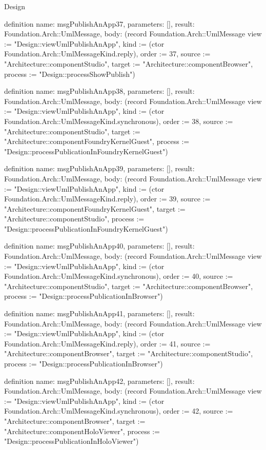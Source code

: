\begin{lexlean}{Design}
\begin{semanticmodule}
definition{
  name: msgPublishAnApp37,
  parameters: [],
  result: Foundation.Arch::UmlMessage,
  body: (record Foundation.Arch::UmlMessage {view := "Design::viewUmlPublishAnApp", kind := (ctor Foundation.Arch::UmlMessageKind.reply), order := 37, source := "Architecture::componentStudio", target := "Architecture::componentBrowser", process := "Design::processShowPublish"})
}

definition{
  name: msgPublishAnApp38,
  parameters: [],
  result: Foundation.Arch::UmlMessage,
  body: (record Foundation.Arch::UmlMessage {view := "Design::viewUmlPublishAnApp", kind := (ctor Foundation.Arch::UmlMessageKind.synchronous), order := 38, source := "Architecture::componentStudio", target := "Architecture::componentFoundryKernelGuest", process := "Design::processPublicationInFoundryKernelGuest"})
}

definition{
  name: msgPublishAnApp39,
  parameters: [],
  result: Foundation.Arch::UmlMessage,
  body: (record Foundation.Arch::UmlMessage {view := "Design::viewUmlPublishAnApp", kind := (ctor Foundation.Arch::UmlMessageKind.reply), order := 39, source := "Architecture::componentFoundryKernelGuest", target := "Architecture::componentStudio", process := "Design::processPublicationInFoundryKernelGuest"})
}

definition{
  name: msgPublishAnApp40,
  parameters: [],
  result: Foundation.Arch::UmlMessage,
  body: (record Foundation.Arch::UmlMessage {view := "Design::viewUmlPublishAnApp", kind := (ctor Foundation.Arch::UmlMessageKind.synchronous), order := 40, source := "Architecture::componentStudio", target := "Architecture::componentBrowser", process := "Design::processPublicationInBrowser"})
}

definition{
  name: msgPublishAnApp41,
  parameters: [],
  result: Foundation.Arch::UmlMessage,
  body: (record Foundation.Arch::UmlMessage {view := "Design::viewUmlPublishAnApp", kind := (ctor Foundation.Arch::UmlMessageKind.reply), order := 41, source := "Architecture::componentBrowser", target := "Architecture::componentStudio", process := "Design::processPublicationInBrowser"})
}

definition{
  name: msgPublishAnApp42,
  parameters: [],
  result: Foundation.Arch::UmlMessage,
  body: (record Foundation.Arch::UmlMessage {view := "Design::viewUmlPublishAnApp", kind := (ctor Foundation.Arch::UmlMessageKind.synchronous), order := 42, source := "Architecture::componentBrowser", target := "Architecture::componentHoloViewer", process := "Design::processPublicationInHoloViewer"})
}


\end{semanticmodule}
\end{lexlean}
